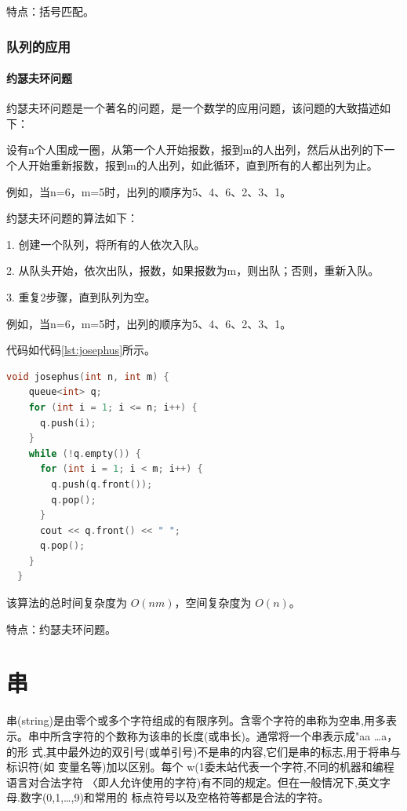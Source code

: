 \documentclass[lang=cn,newtx,10pt,scheme=chinese]{elegantbook}
\begin{document}
特点：括号匹配。

\subsection{队列的应用}

\subsubsection{约瑟夫环问题}

约瑟夫环问题是一个著名的问题，是一个数学的应用问题，该问题的大致描述如下：

设有n个人围成一圈，从第一个人开始报数，报到m的人出列，然后从出列的下一个人开始重新报数，报到m的人出列，如此循环，直到所有的人都出列为止。

例如，当n=6，m=5时，出列的顺序为5、4、6、2、3、1。

约瑟夫环问题的算法如下：

1. 创建一个队列，将所有的人依次入队。

2. 从队头开始，依次出队，报数，如果报数为m，则出队；否则，重新入队。

3. 重复2步骤，直到队列为空。

例如，当n=6，m=5时，出列的顺序为5、4、6、2、3、1。

代码如代码\ref{lst:josephus}所示。

\begin{lstlisting}[language=C++, caption={约瑟夫环问题示例代码}, label={lst:josephus}]
  void josephus(int n, int m) {
    queue<int> q;
    for (int i = 1; i <= n; i++) {
      q.push(i);
    }
    while (!q.empty()) {
      for (int i = 1; i < m; i++) {
        q.push(q.front());
        q.pop();
      }
      cout << q.front() << " ";
      q.pop();
    }
  }

\end{lstlisting}

该算法的总时间复杂度为 $O(nm)$，空间复杂度为 $O(n)$。

特点：约瑟夫环问题。




\chapter{串}

串(string)是由零个或多个字符组成的有限序列。含零个字符的串称为空串,用多表
示。串中所含字符的个数称为该串的长度(或串长)。通常将一个串表示成"aa …a， 的形
式,其中最外边的双引号(或单引号)不是串的内容,它们是串的标志,用于将串与标识符(如
变量名等)加以区别。每个 w(1委未站代表一个字符,不同的机器和编程语言对合法字符
〈即人允许使用的字符)有不同的规定。但在一般情况下,英文字母.数字(0,1,…,9)和常用的
标点符号以及空格符等都是合法的字符。
\end{document}
